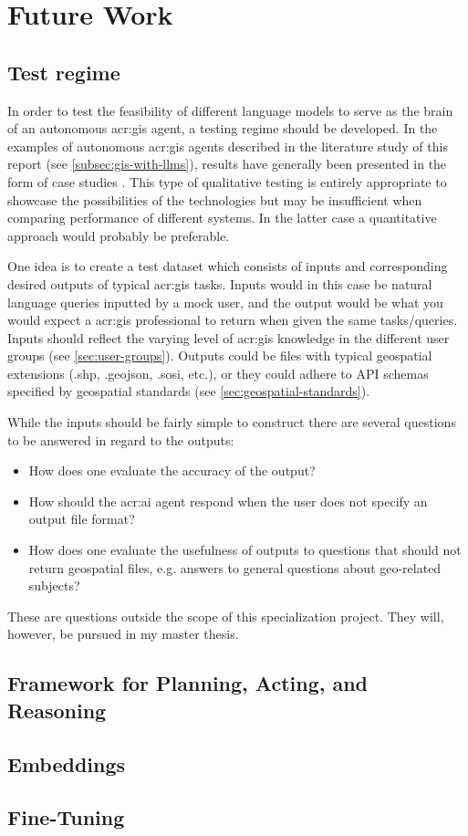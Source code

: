 \section{Future Work}
\label{sec:futureWork}

\subsection{Test regime}

In order to test the feasibility of different language models to serve as the brain of an autonomous \acrshort{acr:gis} agent, a testing regime should be developed. In the examples of autonomous \acrshort{acr:gis} agents described in the literature study of this report (see \autoref{subsec:gis-with-llms}), results have generally been presented in the form of case studies \citep{liAutonomousGISNextgeneration2023,zhangGeoGPTUnderstandingProcessing2023}. This type of qualitative testing is entirely appropriate to showcase the possibilities of the technologies but may be insufficient when comparing performance of different systems. In the latter case a quantitative approach would probably be preferable.

One idea is to create a test dataset which consists of inputs and corresponding desired outputs of typical \acrshort{acr:gis} tasks. Inputs would in this case be natural language queries inputted by a mock user, and the output would be what you would expect a \acrshort{acr:gis} professional to return when given the same tasks/queries. Inputs should reflect the varying level of \acrshort{acr:gis} knowledge in the different user groups (see \autoref{sec:user-groups}). Outputs could be files with typical geospatial extensions (.shp, .geojson, .sosi, etc.), or they could adhere to API schemas specified by geospatial standards (see \autoref{sec:geospatial-standards}).

While the inputs should be fairly simple to construct there are several questions to be answered in regard to the outputs:

\begin{itemize}
    \item How does one evaluate the accuracy of the output?
    \item How should the \acrshort{acr:ai} agent respond when the user does not specify an output file format?
    \item How does one evaluate the usefulness of outputs to questions that should not return geospatial files, e.g. answers to general questions about geo-related subjects?
\end{itemize}

These are questions outside the scope of this specialization project. They will, however, be pursued in my master thesis.

\subsection{Framework for Planning, Acting, and Reasoning}

\subsection{Embeddings}

\subsection{Fine-Tuning}



